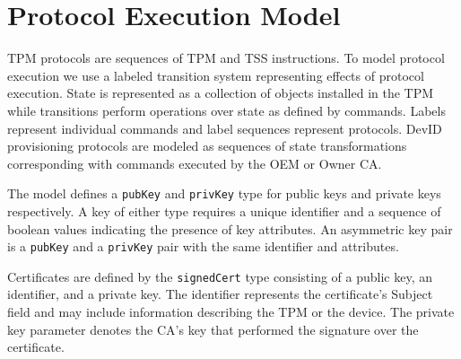 \documentclass[runningheads]{llncs}
\begin{document}

\section{Protocol Execution Model}

TPM protocols are sequences of TPM and TSS instructions.  To model
protocol execution we use a labeled transition system representing
effects of protocol execution.  State is represented as a collection
of objects installed in the TPM while transitions perform operations
over state as defined by commands.  Labels represent individual
commands and label sequences represent protocols.  DevID provisioning
protocols are modeled as sequences of state transformations
corresponding with commands executed by the OEM or Owner CA.


The model defines a \verb|pubKey| and \verb|privKey| type for public
keys and private keys respectively. A key of either type requires a
unique identifier and a sequence of boolean values indicating the
presence of key attributes. An asymmetric key pair is a
\verb|pubKey| and a \verb|privKey| pair with the same identifier and
attributes.



Certificates are defined by the \verb|signedCert| type consisting of a
public key, an identifier, and a private key. The identifier
represents the certificate's Subject field and may include information
describing the TPM or the device. The private key parameter
denotes the CA's key that performed the signature over the
certificate.
\end{document}
